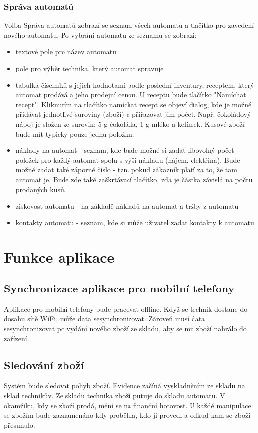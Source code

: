 \documentclass[a4paper,10pt]{article}
\begin{document}
\subsubsection*{Správa automatů}
Volba Správa automatů zobrazí se seznam všech automatů a tlačítko pro zavedení nového automatu. Po vybrání automatu ze seznamu se zobrazí:
\begin{itemize}
	\item textové pole pro název automatu
	\item pole pro výběr technika, který automat spravuje
	\item tabulka číselníků s jejich hodnotami podle poslední inventury, receptem, který automat prodává a jeho prodejní cenou. U receptu bude tlačítko "Namíchat recept".
	Kliknutím na tlačítko namíchat recept se objeví dialog, kde je možné přidávat jednotlivé suroviny (zboží) a přiřazovat jim počet. Např. čokoládový nápoj je složen ze surovin: 5 g čokoláda, 1 g mléko a kelímek. Kusové zboží bude mít typicky pouze jednu položku.
	\item náklady na automat - seznam, kde bude možné si zadat libovolný počet položek pro každý automat spolu s výší nákladu (nájem, elektřina). Bude možné zadat také záporné číslo - tzn. pokud zákazník platí za to, že tam automat je. Bude zde také zaškrtávací tlačítko, zda je částka závislá na počtu prodaných kusů.
	\item ziskovost automatu - na základě nákladů na automat a tržby z automatu
	\item kontakty automatu - seznam, kde si může uživatel zadat kontakty k automatu
\end{itemize}

\section{Funkce aplikace}
\subsection{Synchronizace aplikace pro mobilní telefony}
Aplikace pro mobilní telefony bude pracovat offline. Když se technik dostane do dosahu sítě WiFi, může data sesynchronizovat. Zároveň musí data sesynchronizovat po vydání nového zboží ze skladu, aby se mu zboží nahrálo do zařízení.

\subsection{Sledování zboží}
Systém bude sledovat pohyb zboží. Evidence začíná vyskladněním ze skladu na sklad technikův. Ze skladu technika zboží putuje do skladu automatu. V okamžiku, kdy se zboží prodá, mění se na finanční hotovost. U každé manipulace se zbožím bude zaznamenáno kdy proběhla, kdo ji provedl a odkud kam se zboží přesunulo.
\end{document}

